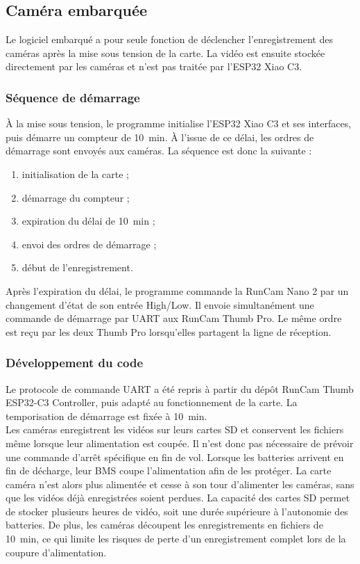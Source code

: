 \subsection{Caméra embarquée}
\label{subsec:camera_logiciel}

Le logiciel embarqué a pour seule fonction de déclencher l'enregistrement des caméras après la mise sous tension de la carte.
La vidéo est ensuite stockée directement par les caméras et n'est pas traitée par l'ESP32 Xiao C3.

\subsubsection{Séquence de démarrage}

À la mise sous tension, le programme initialise l'ESP32 Xiao C3 et ses interfaces, puis démarre un compteur de \SI{10}{\minute}.
À l'issue de ce délai, les ordres de démarrage sont envoyés aux caméras. La séquence est donc la suivante :

\begin{enumerate}
    \item initialisation de la carte ;
    \item démarrage du compteur ;
    \item expiration du délai de \SI{10}{\minute} ;
    \item envoi des ordres de démarrage ;
    \item début de l'enregistrement.
\end{enumerate}

Après l'expiration du délai, le programme commande la RunCam Nano 2 par un changement d'état de son entrée High/Low. Il envoie
simultanément une commande de démarrage par UART aux RunCam Thumb Pro. Le même ordre est reçu par les deux Thumb Pro lorsqu'elles
partagent la ligne de réception.

\subsubsection{Développement du code}

Le protocole de commande UART a été repris à partir du dépôt RunCam Thumb ESP32-C3 Controller\cite{RunCam}, puis adapté au
fonctionnement de la carte. La temporisation de démarrage est fixée à \SI{10}{\minute}.\\

Les caméras enregistrent les vidéos sur leurs cartes SD et conservent les fichiers même lorsque leur alimentation est coupée.
Il n'est donc pas nécessaire de prévoir une commande d'arrêt spécifique en fin de vol. Lorsque les batteries arrivent en fin de
décharge, leur BMS coupe l'alimentation afin de les protéger. La carte caméra n'est alors plus alimentée et cesse à son tour
d'alimenter les caméras, sans que les vidéos déjà enregistrées soient perdues. La capacité des cartes SD permet de stocker
plusieurs heures de vidéo, soit une durée supérieure à l'autonomie des batteries. De plus, les caméras découpent les
enregistrements en fichiers de \SI{10}{\minute}, ce qui limite les risques de perte d'un enregistrement complet lors de la
coupure d'alimentation.\\

